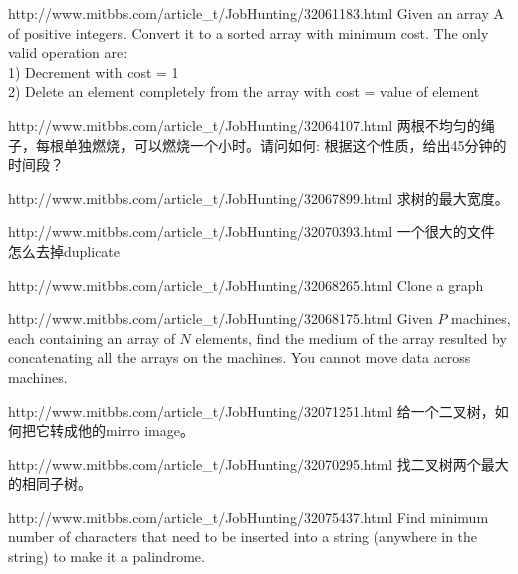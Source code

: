 \documentclass[a4paper]{article}
\begin{document}
\begin{CJK}{UTF8}{gbsn}
\begin{enumerate}
\begin{Q}[Facebook]{http://www.mitbbs.com/article_t/JobHunting/32061183.html}
Given an array A of positive integers. Convert it to a sorted array with minimum cost. The only valid operation are:\\
1) Decrement with cost = 1\\
2) Delete an element completely from the array with cost = value of element
\end{Q}

\begin{Q}{http://www.mitbbs.com/article_t/JobHunting/32064107.html}
两根不均匀的绳子，每根单独燃烧，可以燃烧一个小时。请问如何: 根据这个性质，给出45分钟的时间段？
\end{Q}

\begin{Q}[Amazon]{http://www.mitbbs.com/article_t/JobHunting/32067899.html}
求树的最大宽度。
\end{Q}

\begin{Q}[Facebook]{http://www.mitbbs.com/article_t/JobHunting/32070393.html}
一个很大的文件 怎么去掉duplicate
\end{Q}

\begin{Q}[Facebook]{http://www.mitbbs.com/article_t/JobHunting/32068265.html}
Clone a graph
\end{Q}

\begin{Q}[Google]{http://www.mitbbs.com/article_t/JobHunting/32068175.html}
Given $P$ machines, each containing an array of $N$ elements, find the medium of the array resulted by concatenating all the arrays on the machines. You cannot move data across machines.
\end{Q}

\begin{Q}[Amazon]{http://www.mitbbs.com/article_t/JobHunting/32071251.html}
给一个二叉树，如何把它转成他的mirro image。
\end{Q}

\begin{Q}{http://www.mitbbs.com/article_t/JobHunting/32070295.html}
找二叉树两个最大的相同子树。
\end{Q}

\begin{Q}[Bloomberg]{http://www.mitbbs.com/article_t/JobHunting/32075437.html}
Find minimum number of characters that need to be inserted into a string (anywhere in the string) to make it a palindrome.
\end{Q}


\end{enumerate}
\end{CJK}
\end{document}
